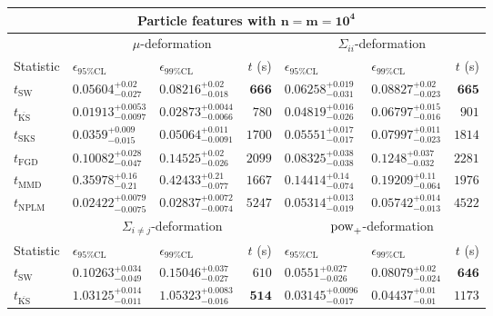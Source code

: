 \begin{tabular}{l|llr|llr}
	\toprule
	\multicolumn{7}{c}{{\bf Particle features with $\mathbf{n=m=10^{4}}$}} \\
	\toprule
	\multicolumn{1}{c}{} & \multicolumn{3}{c}{$\mu$-deformation} & \multicolumn{3}{c}{$\Sigma_{ii}$-deformation} \\
	Statistic & $\epsilon_{95\%\mathrm{CL}}$ & $\epsilon_{99\%\mathrm    {CL}}$ & $t$ (s) & $\epsilon_{95\%\mathrm{CL}}$ & $\epsilon_{99\%\mathrm{CL}}$ & $t$ (s) \\
	\midrule
	$t_{\mathrm{SW}}$ & $0.05604_{-0.027}^{+0.02}$ & $0.08216_{-0.018}^{+0.02}$ & ${\mathbf{666}}$ & $0.06258_{-0.031}^{+0.019}$ & $0.08827_{-0.023}^{+0.02}$ & ${\mathbf{665}}$ \\
	$t_{\overline{\mathrm{KS}}}$ & ${\mathbf{0.01913_{-0.0097}^{+0.0053}}}$ & ${\mathbf{0.02873_{-0.0066}^{+0.0044}}}$ & $780$ & ${\mathbf{0.04819_{-0.026}^{+0.016}}}$ & ${\mathbf{0.06797_{-0.016}^{+0.015}}}$ & $901$ \\
	$t_{\mathrm{SKS}}$ & $0.0359_{-0.015}^{+0.009}$ & $0.05064_{-0.0091}^{+0.011}$ & $1700$ & $0.05551_{-0.017}^{+0.017}$ & $0.07997_{-0.023}^{+0.011}$ & $1814$ \\
	$t_{\mathrm{FGD}}$ & $0.10082_{-0.047}^{+0.028}$ & $0.14525_{-0.026}^{+0.02}$ & $2099$ & $0.08325_{-0.038}^{+0.038}$ & $0.1248_{-0.032}^{+0.037}$ & $2281$ \\
	$t_{\mathrm{MMD}}$ & $0.35978_{-0.21}^{+0.16}$ & $0.42433_{-0.077}^{+0.21}$ & $1667$ & $0.14414_{-0.074}^{+0.14}$ & $0.19209_{-0.064}^{+0.11}$ & $1976$ \\
\rowcolor{red!35}	$t_{\mathrm{NPLM}}$ & $0.02422_{-0.0075}^{+0.0079}$ & $0.02837_{-0.0074}^{+0.0072}$ & $5247$ & $0.05314_{-0.019}^{+0.013}$ & $0.05742_{-0.013}^{+0.014}$ & $4522$ \\
	\toprule
	\multicolumn{1}{c}{} & \multicolumn{3}{c}{$\Sigma_{i\neq j}$-deformation} & \multicolumn{3}{c}{$\rm{pow}_{+}$-deformation} \\
Statistic & $\epsilon_{95\%\mathrm{CL}}$ & $\epsilon_{99\%\mathrm{CL}}$ & $t$ (s) & $\epsilon_{95\%\mathrm{CL}}$ & $\epsilon_{99\%\mathrm{CL}}$ & $t$ (s) \\
	\midrule
	$t_{\mathrm{SW}}$ & $0.10263_{-0.049}^{+0.034}$ & $0.15046_{-0.027}^{+0.037}$ & $610$ & $0.0551_{-0.026}^{+0.027}$ & $0.08079_{-0.024}^{+0.02}$ & ${\mathbf{646}}$ \\
	$t_{\overline{\mathrm{KS}}}$ & $1.03125_{-0.011}^{+0.014}$ & $1.05323_{-0.016}^{+0.0083}$ & ${\mathbf{514}}$ & ${\mathbf{0.03145_{-0.017}^{+0.0096}}}$ & ${\mathbf{0.04437_{-0.01}^{+0.01}}}$ & $1173$ \\

\end{tabular}
